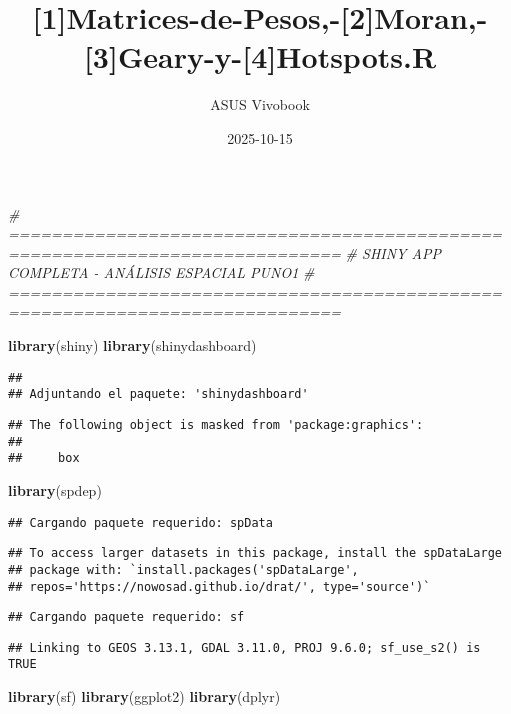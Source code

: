 \documentclass[
]{article}
\title{{[}1{]}Matrices-de-Pesos,-{[}2{]}Moran,-{[}3{]}Geary-y-{[}4{]}Hotspots.R}
\author{ASUS Vivobook}
\date{2025-10-15}
\newenvironment{Shaded}{\begin{snugshade}}{\end{snugshade}}
\newcommand{\CommentTok}[1]{\textcolor[rgb]{0.56,0.35,0.01}{\textit{#1}}}
\newcommand{\FunctionTok}[1]{\textcolor[rgb]{0.13,0.29,0.53}{\textbf{#1}}}
\newcommand{\NormalTok}[1]{#1}
\begin{document}
\maketitle

\begin{Shaded}
\begin{Highlighting}[]
\CommentTok{\# =============================================================================}
\CommentTok{\# SHINY APP COMPLETA {-} ANÁLISIS ESPACIAL PUNO1}
\CommentTok{\# =============================================================================}

\FunctionTok{library}\NormalTok{(shiny)}
\FunctionTok{library}\NormalTok{(shinydashboard)}
\end{Highlighting}
\end{Shaded}

\begin{verbatim}
## 
## Adjuntando el paquete: 'shinydashboard'
\end{verbatim}

\begin{verbatim}
## The following object is masked from 'package:graphics':
## 
##     box
\end{verbatim}

\begin{Shaded}
\begin{Highlighting}[]
\FunctionTok{library}\NormalTok{(spdep)}
\end{Highlighting}
\end{Shaded}

\begin{verbatim}
## Cargando paquete requerido: spData
\end{verbatim}

\begin{verbatim}
## To access larger datasets in this package, install the spDataLarge
## package with: `install.packages('spDataLarge',
## repos='https://nowosad.github.io/drat/', type='source')`
\end{verbatim}

\begin{verbatim}
## Cargando paquete requerido: sf
\end{verbatim}

\begin{verbatim}
## Linking to GEOS 3.13.1, GDAL 3.11.0, PROJ 9.6.0; sf_use_s2() is TRUE
\end{verbatim}

\begin{Shaded}
\begin{Highlighting}[]
\FunctionTok{library}\NormalTok{(sf)}
\FunctionTok{library}\NormalTok{(ggplot2)}
\FunctionTok{library}\NormalTok{(dplyr)}
\end{Highlighting}
\end{Shaded}
\end{document}
